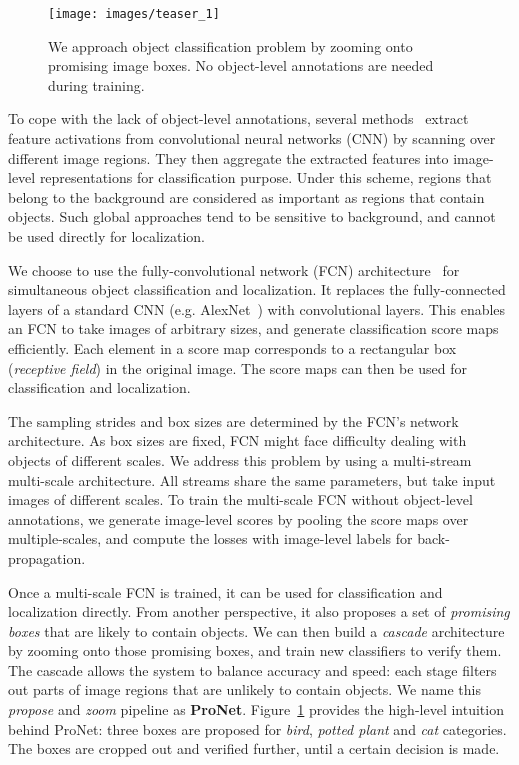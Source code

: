 \documentclass[10pt,twocolumn,letterpaper]{article}
\begin{document}
\begin{figure}[t]
  \centering
    \texttt{[image: images/teaser\_1]}
  \caption{We approach object classification problem by zooming onto promising image boxes. No object-level annotations are needed during training.}
  \label{fig:teaser}
\end{figure}

To cope with the lack of object-level annotations, several methods~\cite{DBLP:journals/corr/ChatfieldSVZ14,DBLP:journals/corr/GongWGL14,Simonyan14c} extract feature activations from convolutional neural networks (CNN) by scanning over different image regions. They then aggregate the extracted features into image-level representations for classification purpose. Under this scheme, regions that belong to the background are considered as important as regions that contain objects. Such global approaches tend to be sensitive to background, and cannot be used directly for localization.

We choose to use the fully-convolutional network (FCN) architecture~\cite{DBLP:journals/corr/LongSD14,Oquab_2015_CVPR,pinheiro:2015a,DBLP:journals/corr/SermanetEZMFL13,DBLP:journals/corr/PathakSLD14} for simultaneous object classification and localization. It replaces the fully-connected layers of a standard CNN (e.g. AlexNet~\cite{NIPS2012_4824}) with convolutional layers. This enables an FCN to take images of arbitrary sizes, and generate classification score maps efficiently. Each element in a score map corresponds to a rectangular box (\textit{receptive field}) in the original image. The score maps can then be used for classification and localization.

The sampling strides and box sizes are determined by the FCN's network architecture. As box sizes are fixed, FCN might face difficulty dealing with objects of different scales. We address this problem by using a multi-stream multi-scale architecture. All streams share the same parameters, but take input images of different scales. To train the multi-scale FCN without object-level annotations, we generate image-level scores by pooling the score maps over multiple-scales, and compute the losses with image-level labels for back-propagation.








Once a multi-scale FCN is trained, it can be used for classification and localization directly. From another perspective, it also proposes a set of \textit{promising boxes} that are likely to contain objects. We can then build a \textit{cascade} architecture by zooming onto those promising boxes, and train new classifiers to verify them. The cascade allows the system to balance accuracy and speed: each stage filters out parts of image regions that are unlikely to contain objects. We name this \textit{propose} and \textit{zoom} pipeline as \textbf{ProNet}. Figure~\ref{fig:teaser} provides the high-level intuition behind ProNet: three boxes are proposed for \textit{bird}, \textit{potted plant} and \textit{cat} categories. The boxes are cropped out and verified further, until a certain decision is made.
\end{document}
